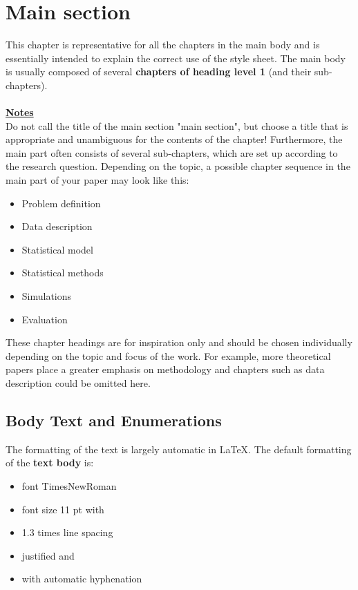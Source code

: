 \section{Main section}\label{sec:mainsection}

This chapter is representative for all the chapters in the main body and is essentially intended to explain the correct use of the style sheet. The main body is usually composed of several \textbf{chapters of heading level 1} (and their sub-chapters).\\
\\
\textbf{\uline{Notes}}\\
Do not call the title of the main section "main section", but choose a title that is appropriate and unambiguous for the contents of the chapter! Furthermore, the main part often consists of several sub-chapters, which are set up according to the research question. Depending on the topic, a possible chapter sequence in the main part of your paper may look like this:
\begin{itemize}
    \item Problem definition
    \item Data description
    \item Statistical model
    \item Statistical methods
    \item Simulations
    \item Evaluation
\end{itemize}

These chapter headings are for inspiration only and should be chosen individually depending on the topic and focus of the work. For example, more theoretical papers place a greater emphasis on methodology and chapters such as data description could be omitted here.
\\

\subsection{Body Text and Enumerations}
The formatting of the text is largely automatic in \LaTeX.
The default formatting of the \textbf{text body} is:
\begin{itemize}
    \item font TimesNewRoman
    \item font size 11 pt with
    \item 1.3 times line spacing 
    \item justified and
    \item with automatic hyphenation 
\end{itemize}

